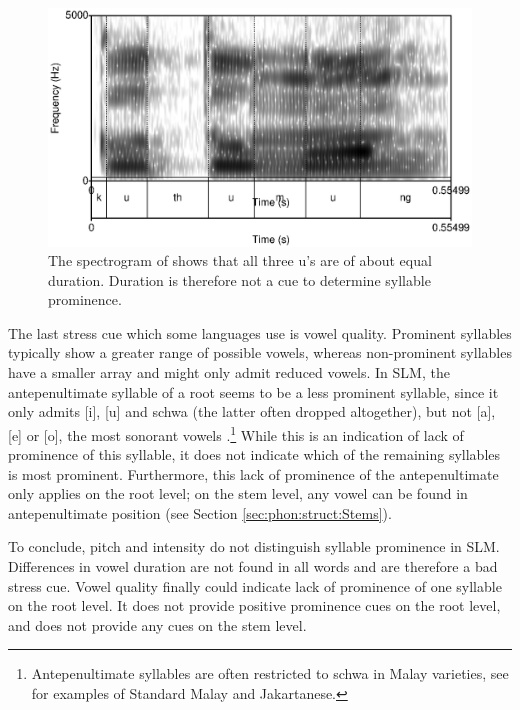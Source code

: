 \begin{figure}
 \centering
\includegraphics{pics/kuthumung-spectro.eps}
 \caption[Duration of vowels in ]{The spectrogram of  shows that all three u's are of about equal duration. Duration is therefore not a cue to determine syllable prominence.}
\label{fig:kuthumungspectro}
\end{figure}


The last stress cue which some languages use is vowel quality. Prominent syllables typically show a greater range of possible vowels, whereas non-prominent syllables have a smaller array and might only admit reduced vowels. In SLM, the antepenultimate syllable  of a root seems to be a less prominent syllable, since it only admits  [i], [u] and schwa (the latter often dropped altogether), but not [a], [e] or [o], the most sonorant vowels \citep{Selkirk1984,Clements1990sonority, Rice1992sonority}\kuckn.\footnote{Antepenultimate syllables are often restricted to schwa in Malay varieties, see \citet[12,31,59]{Adelaar1985} for examples of Standard Malay and Jakartanese.} While this is an indication of lack of prominence of this syllable, it does not indicate which of the remaining syllables is most prominent. Furthermore, this lack of prominence of the antepenultimate only applies on the root level; on the stem level, any vowel can be found in antepenultimate position (see Section \ref{sec:phon:struct:Stems}).

To conclude, pitch and intensity do not distinguish syllable prominence in SLM. Differences in vowel duration are not found in all words and are therefore a bad stress cue. Vowel quality finally could indicate lack of prominence of one syllable on the root level. It does not provide positive prominence cues on the root level, and does not provide any cues on the stem level.


